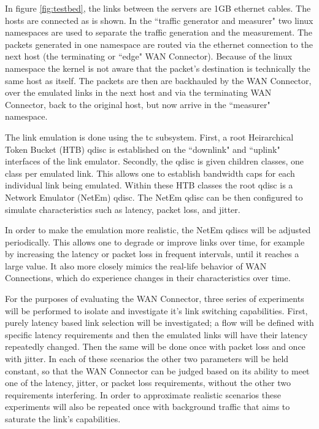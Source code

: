In figure \ref{fig:testbed}, the links between the servers are 1GB ethernet cables. The hosts are connected as is shown. In the “traffic generator and measurer" two linux namespaces are used to separate the traffic generation and the measurement. The packets generated in one namespace are routed via the ethernet connection to the next host (the terminating or “edge" WAN Connector). Because of the linux namespace the kernel is not aware that the packet's destination is technically the same host as itself. The packets are then are backhauled by the WAN Connector, over the emulated links in the next host and via the terminating WAN Connector, back to the original host, but now arrive in the “measurer" namespace.

The link emulation is done using the tc subsystem. First, a root Heirarchical Token Bucket (HTB) qdisc is established on the “downlink" and “uplink" interfaces of the link emulator. Secondly, the qdisc is given children classes, one class per emulated link. This allows one to establish bandwidth caps for each individual link being emulated. Within these HTB classes the root qdisc is a Network Emulator (NetEm) qdisc. The NetEm qdisc can be then configured to simulate characteristics such as latency, packet loss, and jitter.


In order to make the emulation more realistic, the NetEm qdiscs will be adjusted periodically. This allows one to degrade or improve links over time, for example by increasing the latency or packet loss in frequent intervals, until it reaches a large value. It also more closely mimics the real-life behavior of WAN Connections, which do experience changes in their characteristics over time.

For the purposes of evaluating the WAN Connector, three series of experiments will be performed to isolate and investigate it's link switching capabilities. First, purely latency based link selection will be investigated; a flow will be defined with specific latency requirements and then the emulated links will have their latency repeatedly changed. Then the same will be done once with packet loss and once with jitter. In each of these scenarios the other two parameters will be held constant, so that the WAN Connector can be judged based on its ability to meet one of the latency, jitter, or packet loss requirements, without the other two requirements interfering. In order to approximate realistic scenarios these experiments will also be repeated once with background traffic that aims to saturate the link's capabilities.

